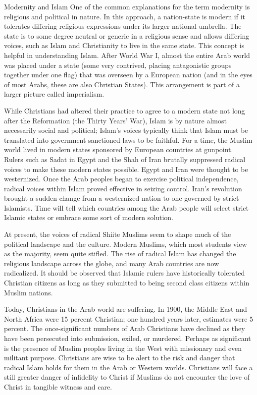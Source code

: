 \begin{sidebar}{Modernity and Islam}
One of the common explanations for the term modernity is religious and political in nature. In this
approach, a nation-state is modern if it tolerates differing religious expressions under its larger
national umbrella. The state is to some degree neutral or generic in a religious sense and allows
differing voices, such as Islam and Christianity to live in the same state. This concept is helpful
in understanding Islam. After World War I, almost the entire Arab world was placed under a state
(some very contrived, placing antagonistic groups together under one flag) that was overseen by a
European nation (and in the eyes of most Arabs, these are also Christian States). This arrangement
is part of a larger picture called imperialism.

While Christians had altered their practice to agree to a modern state not long after the
Reformation (the Thirty Years’ War), Islam is by nature almost necessarily social and political;
Islam’s voices typically think that Islam must be translated into government-sanctioned laws to be
faithful. For a time, the Muslim world lived in modern states sponsored by European countries at
gunpoint. Rulers such as Sadat in Egypt and the Shah of Iran brutally suppressed radical voices to
make these modern states possible. Egypt and Iran were thought to be westernized. Once the Arab
peoples began to exercise political independence, radical voices within Islam proved effective in
seizing control. Iran’s revolution brought a sudden change from a westernized nation to one governed
by strict Islamists. Time will tell which countries among the Arab people will select strict Islamic
states or embrace some sort of modern solution.

At present, the voices of radical Shiite Muslims seem to shape much of the political landscape and
the culture. Modern Muslims, which most students view as the majority, seem quite stifled. The rise
of radical Islam has changed the religious landscape across the globe, and many Arab countries are
now radicalized. It should be observed that Islamic rulers have historically tolerated Christian
citizens as long as they submitted to being second class citizens within Muslim nations.
\end{sidebar}

Today, Christians in the Arab world are suffering. In 1900, the Middle East and North Africa were 15
percent Christian; one hundred years later, estimates were 5 percent. The once-significant numbers
of Arab Christians have declined as they have been persecuted into submission, exiled, or murdered.
Perhaps as significant is the presence of Muslim peoples living in the West with missionary and even
militant purpose. Christians are wise to be alert to the risk and danger that radical Islam holds
for them in the Arab or Western worlds. Christians will face a still greater danger of infidelity to
Christ if Muslims do not encounter the love of Christ in tangible witness and care.

